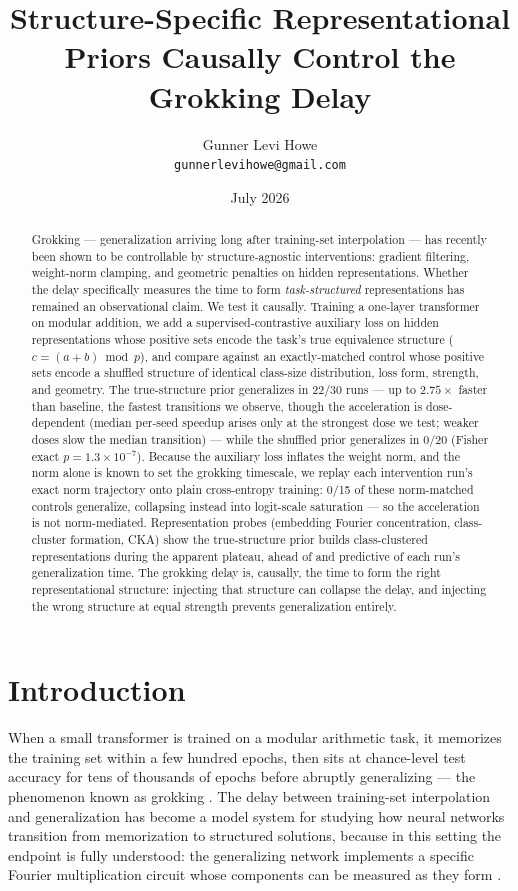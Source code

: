 \documentclass[11pt]{article}
\title{Structure-Specific Representational Priors Causally Control the Grokking Delay}
\author{Gunner Levi Howe\\ \small{\texttt{gunnerlevihowe@gmail.com}}}
\date{July 2026}
\begin{document}
\maketitle

\begin{abstract}
Grokking --- generalization arriving long after training-set interpolation --- has recently been
shown to be controllable by structure-agnostic interventions: gradient filtering, weight-norm
clamping, and geometric penalties on hidden representations. Whether the delay specifically
measures the time to form \emph{task-structured} representations has remained an observational
claim. We test it causally. Training a one-layer transformer on modular addition, we add a
supervised-contrastive auxiliary loss on hidden representations whose positive sets encode the
task's true equivalence structure ($c=(a+b)\bmod p$), and compare against an exactly-matched
control whose positive sets encode a shuffled structure of identical class-size distribution,
loss form, strength, and geometry. The true-structure prior generalizes in 22/30 runs --- up to
$2.75\times$ faster than baseline, the fastest transitions we observe, though the acceleration is
dose-dependent (median per-seed speedup arises only at the strongest dose we test; weaker doses
slow the median transition) --- while the shuffled prior generalizes in 0/20 (Fisher exact
$p=1.3\times10^{-7}$). Because the auxiliary loss
inflates the weight norm, and the norm alone is known to set the grokking timescale, we replay
each intervention run's exact norm trajectory onto plain cross-entropy training: 0/15 of these
norm-matched controls generalize, collapsing instead into logit-scale saturation --- so the
acceleration is not norm-mediated. Representation probes (embedding Fourier concentration,
class-cluster formation, CKA) show the true-structure prior builds class-clustered
representations during the apparent plateau, ahead of and predictive of each run's
generalization time. The grokking delay is, causally, the time to form the right representational
structure: injecting that structure can collapse the delay, and injecting the wrong structure at
equal strength prevents generalization entirely.
\end{abstract}

\section{Introduction}

When a small transformer is trained on a modular arithmetic task, it memorizes the training set
within a few hundred epochs, then sits at chance-level test accuracy for tens of thousands of
epochs before abruptly generalizing --- the phenomenon known as grokking
\citep{power2022grokking}. The delay between training-set interpolation and generalization has
become a model system for studying how neural networks transition from memorization to structured
solutions, because in this setting the endpoint is fully understood: the generalizing network
implements a specific Fourier multiplication circuit whose components can be measured as they form
\citep{nanda2023progress, gromov2023grokking}.
\end{document}
